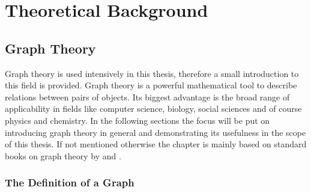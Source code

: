 
\part{Theoretical Background}
\label{sec:theory}

\chapter{Graph Theory}
\label{sec:graphtheory}

Graph theory is used intensively in this thesis, therefore a small introduction
to this field is provided. Graph theory is a powerful mathematical tool to
describe relations between pairs of objects. Its biggest advantage is the broad
range of applicability in fields like computer science, biology, social sciences
and of course physics and chemistry. In the following sections the focus will be
put on introducing graph theory in general and demonstrating its usefulness in
the scope of this thesis. If not mentioned otherwise the chapter is mainly based
on standard books on graph theory by
\citeauthor{West_Introductiongraphtheory_2001}\autocite{West_Introductiongraphtheory_2001}
and
\citeauthor{Balakrishnan_Schaumoutlinetheory_1997}\autocite{Balakrishnan_Schaumoutlinetheory_1997}.

\section{The Definition of a Graph}
\label{sec:DefinitionGraph}

